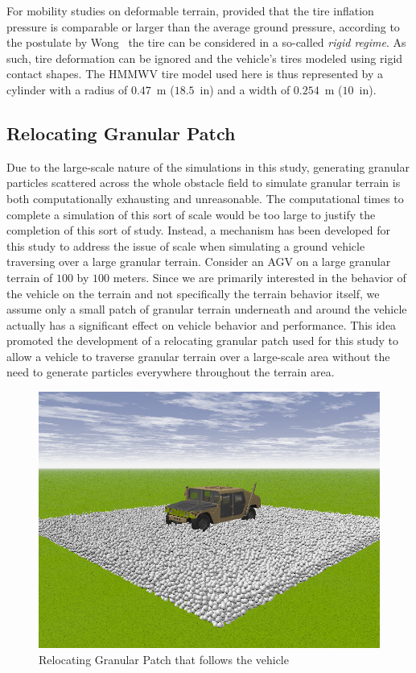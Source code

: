 \documentclass[12pt,twocolumn]{article}
\begin{document}
For mobility studies on deformable terrain, provided that the tire inflation pressure is comparable or larger than the average ground pressure, according to the postulate by Wong~\cite{wong93} the tire can be considered in a so-called {\em rigid regime}.  As such, tire deformation can be ignored and the vehicle's tires modeled using rigid contact shapes.  The HMMWV tire model used here is thus represented by a cylinder with a radius of $0.47$~m ($18.5$~in) and a width of $0.254$~m ($10$~in).



\subsection{Relocating Granular Patch }\label{ss:Patch}

Due to the large-scale nature of the simulations in this study, generating granular particles scattered across the whole obstacle field to simulate granular terrain is both computationally exhausting and unreasonable. The computational times to complete a simulation of this sort of scale would be too large to justify the completion of this sort of study. Instead, a mechanism has been developed for this study to address the issue of scale when simulating a ground vehicle traversing over a large granular terrain. Consider an AGV on a large granular terrain of $100$ by $100$ meters. Since we are primarily interested in the behavior of the vehicle on the terrain and not specifically the terrain behavior itself, we assume only a small patch of granular terrain underneath and around the vehicle actually has a significant effect on vehicle behavior and performance. This idea promoted the development of a relocating granular patch used for this study to allow a vehicle to traverse granular terrain over a large-scale area without the need to generate particles everywhere throughout the terrain area. 

\begin{figure}
	\centering
	\includegraphics[width=0.8\columnwidth]{Figs/granPatch.png}
	\caption{\small Relocating Granular Patch that follows the vehicle}  
	\label{fig:granPatch}
\end{figure}
\end{document}
